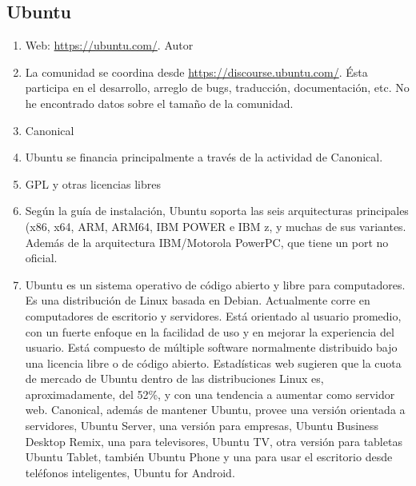 \subsection{Ubuntu}
\begin{enumerate}
    \item Web: \url{https://ubuntu.com/}. Autor
    \item La comunidad se coordina desde \url{https://discourse.ubuntu.com/}. Ésta participa en el desarrollo, arreglo de bugs, traducción, documentación, etc. No he encontrado datos sobre el tamaño de la comunidad.
    \item Canonical
    \item Ubuntu se financia principalmente a través de la actividad de Canonical.
    \item GPL y otras licencias libres
    \item Según la guía de instalación, Ubuntu soporta las seis arquitecturas principales (x86, x64, ARM, ARM64, IBM POWER e IBM z, y muchas de sus variantes.\\Además de la arquitectura IBM/Motorola PowerPC, que tiene un port no oficial.
    \item Ubuntu es un sistema operativo de código abierto y libre para computadores. Es una distribución de Linux basada en Debian. Actualmente corre en computadores de escritorio y servidores. Está orientado al usuario promedio, con un fuerte enfoque en la facilidad de uso y en mejorar la experiencia del usuario. Está compuesto de múltiple software normalmente distribuido bajo una licencia libre o de código abierto. Estadísticas web sugieren que la cuota de mercado de Ubuntu dentro de las distribuciones Linux es, aproximadamente, del 52\%, y con una tendencia a aumentar como servidor web. Canonical, además de mantener Ubuntu, provee una versión orientada a servidores, Ubuntu Server, una versión para empresas, Ubuntu Business Desktop Remix, una para televisores, Ubuntu TV, otra versión para tabletas Ubuntu Tablet, también Ubuntu Phone y una para usar el escritorio desde teléfonos inteligentes, Ubuntu for Android.
\end{enumerate}


